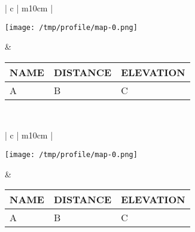 \documentclass[english,ms,10pt]{memoir}
\def\profileheight{5cm}
\def\mapheight{8cm}
\begin{document}
\begin{table}[h!]
  \centering
  \begin{tabular}{ | c | m{10cm} | }
    \hline
     \\
    \hline
    \begin{minipage}{.3\textwidth}
      \texttt{[image: /tmp/profile/map-0.png]}
    \end{minipage}
    &
    \begin{tabular}{|l|l|l|}
      \hline
      NAME & DISTANCE & ELEVATION  \\
      \hline
      A & B & C \\
      \hline
    \end{tabular} 
    \\ \hline
  \end{tabular}
\end{table}

\begin{table}[h!]
  \centering
  \begin{tabular}{ | c | m{10cm} | }
    \hline
     \\
    \hline
    \begin{minipage}{.3\textwidth}
      \texttt{[image: /tmp/profile/map-0.png]}
    \end{minipage}
    &
    \begin{tabular}{|l|l|l|}
      \hline
      NAME & DISTANCE & ELEVATION  \\
      \hline
      A & B & C \\
      \hline
    \end{tabular} 
    \\ \hline
  \end{tabular}
\end{table}
\end{document}
